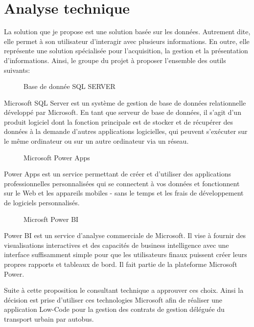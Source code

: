 \section{Analyse technique}
La solution que je propose est une solution basée sur les données.
Autrement dite, elle permet à son utilisateur d'interagir avec plusieurs
informations. En outre, elle représente une solution spécialisée pour
l'acquisition, la gestion et la présentation d'informations. Ainsi, le groupe du projet à proposer l'ensemble des outils suivants:
\begin{figure}[H]
    \begin{center}
        \caption{Base de donnée SQL SERVER}
    \end{center}
\end{figure}
Microsoft SQL Server est un système de gestion
de base de données relationnelle développé
par Microsoft. En tant que serveur de base de
données, il s'agit d'un produit logiciel dont la
fonction principale est de stocker et de
récupérer des données à la demande d'autres
applications logicielles, qui peuvent
s'exécuter sur le même ordinateur ou sur un
autre ordinateur via un réseau.
\begin{figure}[H]
    \begin{center}
        \caption{Microsoft Power Apps}
    \end{center}
\end{figure}
Power Apps est un service permettant de créer
et d'utiliser des applications professionnelles
personnalisées qui se connectent à vos
données et fonctionnent sur le Web et les
appareils mobiles - sans le temps et les frais
de développement de logiciels personnalisés.
\begin{figure}[H]
    \begin{center}
        \caption{Microsft Power BI}
    \end{center}
\end{figure}
Power BI est un service d'analyse
commerciale de Microsoft. Il vise à fournir des
visualisations interactives et des capacités de
business intelligence avec une interface
suffisamment simple pour que les utilisateurs
finaux puissent créer leurs propres rapports et
tableaux de bord. Il fait partie de la plateforme
Microsoft Power.

Suite à cette proposition le consultant technique a approuver ces choix. Ainsi la décision est prise d'utiliser ces technologies Microsoft afin de réaliser une application Low-Code pour la gestion des contrats de gestion déléguée du transport urbain par autobus.
